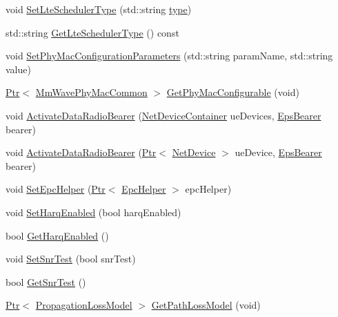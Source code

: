 \begin{DoxyCompactItemize}
\item 
void \hyperlink{classns3_1_1MmWaveHelper_a46545a203927cdcf48448c740332fcde}{Set\+Lte\+Scheduler\+Type} (std\+::string \hyperlink{visualizer-ideas_8txt_add98db9e15e2a58cf2b57623e7aa893a}{type})
\item 
std\+::string \hyperlink{classns3_1_1MmWaveHelper_a32b038faf4e0e47054d31da50f7332ad}{Get\+Lte\+Scheduler\+Type} () const 
\item 
void \hyperlink{classns3_1_1MmWaveHelper_a32dc7803e0a5a5b556939aaf869c242d}{Set\+Phy\+Mac\+Configuration\+Parameters} (std\+::string param\+Name, std\+::string value)
\item 
\hyperlink{classns3_1_1Ptr}{Ptr}$<$ \hyperlink{classns3_1_1MmWavePhyMacCommon}{Mm\+Wave\+Phy\+Mac\+Common} $>$ \hyperlink{classns3_1_1MmWaveHelper_ab4f7b3fad4e6c58765c1023e36952c1b}{Get\+Phy\+Mac\+Configurable} (void)
\item 
void \hyperlink{classns3_1_1MmWaveHelper_a9178ae3493484a9582039bb14edb282a}{Activate\+Data\+Radio\+Bearer} (\hyperlink{classns3_1_1NetDeviceContainer}{Net\+Device\+Container} ue\+Devices, \hyperlink{structns3_1_1EpsBearer}{Eps\+Bearer} bearer)
\item 
void \hyperlink{classns3_1_1MmWaveHelper_ad5100753172ca97ae38f7eb1368b3d95}{Activate\+Data\+Radio\+Bearer} (\hyperlink{classns3_1_1Ptr}{Ptr}$<$ \hyperlink{classns3_1_1NetDevice}{Net\+Device} $>$ ue\+Device, \hyperlink{structns3_1_1EpsBearer}{Eps\+Bearer} bearer)
\item 
void \hyperlink{classns3_1_1MmWaveHelper_a54fc98a649a710153b479d0878558733}{Set\+Epc\+Helper} (\hyperlink{classns3_1_1Ptr}{Ptr}$<$ \hyperlink{classns3_1_1EpcHelper}{Epc\+Helper} $>$ epc\+Helper)
\item 
void \hyperlink{classns3_1_1MmWaveHelper_af211a02952ab5f4eabe0219cf53e7e1c}{Set\+Harq\+Enabled} (bool harq\+Enabled)
\item 
bool \hyperlink{classns3_1_1MmWaveHelper_ab4f31091aa35a4d01a6c5d3c6e41b177}{Get\+Harq\+Enabled} ()
\item 
void \hyperlink{classns3_1_1MmWaveHelper_ac25fffd187a813ecbf1922adcf050001}{Set\+Snr\+Test} (bool snr\+Test)
\item 
bool \hyperlink{classns3_1_1MmWaveHelper_a07164a364d8afc9275ff263373acde48}{Get\+Snr\+Test} ()
\item 
\hyperlink{classns3_1_1Ptr}{Ptr}$<$ \hyperlink{classns3_1_1PropagationLossModel}{Propagation\+Loss\+Model} $>$ \hyperlink{classns3_1_1MmWaveHelper_a377d1c8c4c43a88801e905d88b8a5740}{Get\+Path\+Loss\+Model} (void)
\item 

\end{DoxyCompactItemize}
